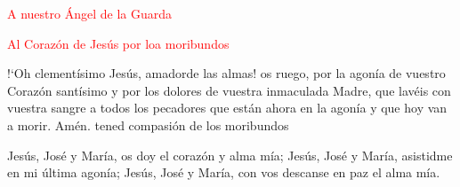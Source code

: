 \documentclass[9pt]{article}
\begin{document}
\begin{multicols}{2}
      \vspace{1mm}

      \textcolor{red}{A nuestro Ángel de la Guarda}

      

      \vspace{1mm}

      \textcolor{red}{Al Corazón de Jesús por loa moribundos}

      {!`}Oh clementísimo Jesús, amadorde las almas! os ruego, por la agonía de vuestro Corazón santísimo y por los dolores de vuestra inmaculada Madre,
      que lavéis con vuestra sangre a todos los pecadores que están ahora en la agonía y que hoy van a morir. Amén.
      {tened compasión de los moribundos}

      \vspace{1mm}

      Jesús, José y María, os doy el corazón y alma mía; Jesús, José y María, asistidme en mi última agonía; Jesús, José y María, con vos descanse en paz el alma mía.

      \vspace{1mm}


      \vspace{1mm}

      

      \vspace{1mm}

      
\end{multicols}
\end{document}

